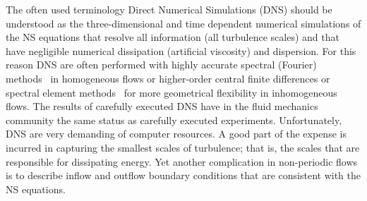 

The often used terminology Direct Numerical Simulations (DNS) should
be understood as the three-dimensional and time dependent numerical
simulations of the NS equations that resolve all information (all
turbulence scales) and that have negligible numerical dissipation
(artificial viscosity) and dispersion. For this reason DNS are often
performed with highly accurate spectral (Fourier) 
methods~\citep{CanutoHussainiQuarteroniEtAl1988} in homogeneous flows or
higher-order central finite differences or spectral element 
methods~\citep{Blackburn2009} for more geometrical flexibility in inhomogeneous
flows. The results of carefully executed DNS have in the fluid
mechanics community the same status as carefully executed
experiments. Unfortunately, DNS are very demanding of computer
resources. A good part of the expense is incurred in capturing the
smallest scales of turbulence; that is, the scales that are responsible
for dissipating energy. Yet another complication in non-periodic flows
is to describe inflow and outflow boundary conditions that are
consistent with the NS equations.

